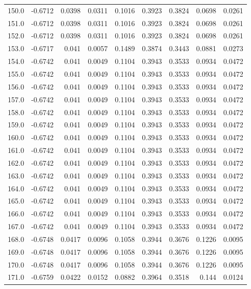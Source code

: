 \begin{longtable}{lrrrrrrrr}
150.0 & -0.6712 & 0.0398 & 0.0311 & 0.1016 & 0.3923 & 0.3824 & 0.0698 & 0.0261 \\
151.0 & -0.6712 & 0.0398 & 0.0311 & 0.1016 & 0.3923 & 0.3824 & 0.0698 & 0.0261 \\
152.0 & -0.6712 & 0.0398 & 0.0311 & 0.1016 & 0.3923 & 0.3824 & 0.0698 & 0.0261 \\
153.0 & -0.6717 & 0.041 & 0.0057 & 0.1489 & 0.3874 & 0.3443 & 0.0881 & 0.0273 \\
154.0 & -0.6742 & 0.041 & 0.0049 & 0.1104 & 0.3943 & 0.3533 & 0.0934 & 0.0472 \\
155.0 & -0.6742 & 0.041 & 0.0049 & 0.1104 & 0.3943 & 0.3533 & 0.0934 & 0.0472 \\
156.0 & -0.6742 & 0.041 & 0.0049 & 0.1104 & 0.3943 & 0.3533 & 0.0934 & 0.0472 \\
157.0 & -0.6742 & 0.041 & 0.0049 & 0.1104 & 0.3943 & 0.3533 & 0.0934 & 0.0472 \\
158.0 & -0.6742 & 0.041 & 0.0049 & 0.1104 & 0.3943 & 0.3533 & 0.0934 & 0.0472 \\
159.0 & -0.6742 & 0.041 & 0.0049 & 0.1104 & 0.3943 & 0.3533 & 0.0934 & 0.0472 \\
160.0 & -0.6742 & 0.041 & 0.0049 & 0.1104 & 0.3943 & 0.3533 & 0.0934 & 0.0472 \\
161.0 & -0.6742 & 0.041 & 0.0049 & 0.1104 & 0.3943 & 0.3533 & 0.0934 & 0.0472 \\
162.0 & -0.6742 & 0.041 & 0.0049 & 0.1104 & 0.3943 & 0.3533 & 0.0934 & 0.0472 \\
163.0 & -0.6742 & 0.041 & 0.0049 & 0.1104 & 0.3943 & 0.3533 & 0.0934 & 0.0472 \\
164.0 & -0.6742 & 0.041 & 0.0049 & 0.1104 & 0.3943 & 0.3533 & 0.0934 & 0.0472 \\
165.0 & -0.6742 & 0.041 & 0.0049 & 0.1104 & 0.3943 & 0.3533 & 0.0934 & 0.0472 \\
166.0 & -0.6742 & 0.041 & 0.0049 & 0.1104 & 0.3943 & 0.3533 & 0.0934 & 0.0472 \\
167.0 & -0.6742 & 0.041 & 0.0049 & 0.1104 & 0.3943 & 0.3533 & 0.0934 & 0.0472 \\
168.0 & -0.6748 & 0.0417 & 0.0096 & 0.1058 & 0.3944 & 0.3676 & 0.1226 & 0.0095 \\
169.0 & -0.6748 & 0.0417 & 0.0096 & 0.1058 & 0.3944 & 0.3676 & 0.1226 & 0.0095 \\
170.0 & -0.6748 & 0.0417 & 0.0096 & 0.1058 & 0.3944 & 0.3676 & 0.1226 & 0.0095 \\
171.0 & -0.6759 & 0.0422 & 0.0152 & 0.0882 & 0.3964 & 0.3518 & 0.144 & 0.0124 \\

\end{longtable}
